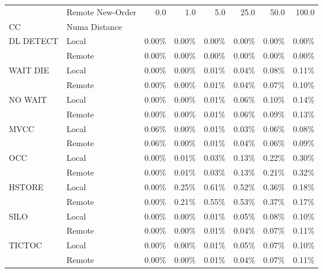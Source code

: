 \begin{tabular}{llrrrrrr}
\toprule
       & Remote New-Order &  0.0   &  1.0   &  5.0   &  25.0  &  50.0  &  100.0 \\
CC & Numa Distance &        &        &        &        &        &        \\
\midrule
DL DETECT & Local &  0.00\% &  0.00\% &  0.00\% &  0.00\% &  0.00\% &  0.00\% \\
       & Remote &  0.00\% &  0.00\% &  0.00\% &  0.00\% &  0.00\% &  0.00\% \\
WAIT DIE & Local &  0.00\% &  0.00\% &  0.01\% &  0.04\% &  0.08\% &  0.11\% \\
       & Remote &  0.00\% &  0.00\% &  0.01\% &  0.04\% &  0.07\% &  0.10\% \\
NO WAIT & Local &  0.00\% &  0.00\% &  0.01\% &  0.06\% &  0.10\% &  0.14\% \\
       & Remote &  0.00\% &  0.00\% &  0.01\% &  0.06\% &  0.09\% &  0.13\% \\
MVCC & Local &  0.06\% &  0.00\% &  0.01\% &  0.03\% &  0.06\% &  0.08\% \\
       & Remote &  0.06\% &  0.00\% &  0.01\% &  0.04\% &  0.06\% &  0.09\% \\
OCC & Local &  0.00\% &  0.01\% &  0.03\% &  0.13\% &  0.22\% &  0.30\% \\
       & Remote &  0.00\% &  0.01\% &  0.03\% &  0.13\% &  0.21\% &  0.32\% \\
HSTORE & Local &  0.00\% &  0.25\% &  0.61\% &  0.52\% &  0.36\% &  0.18\% \\
       & Remote &  0.00\% &  0.21\% &  0.55\% &  0.53\% &  0.37\% &  0.17\% \\
SILO & Local &  0.00\% &  0.00\% &  0.01\% &  0.05\% &  0.08\% &  0.10\% \\
       & Remote &  0.00\% &  0.00\% &  0.01\% &  0.04\% &  0.07\% &  0.11\% \\
TICTOC & Local &  0.00\% &  0.00\% &  0.01\% &  0.05\% &  0.07\% &  0.10\% \\
       & Remote &  0.00\% &  0.00\% &  0.01\% &  0.04\% &  0.07\% &  0.11\% \\
\bottomrule
\end{tabular}
